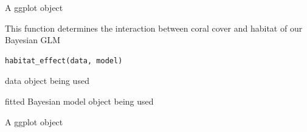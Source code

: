 \documentclass[a4paper]{book}
\begin{document}
%
\begin{Value}
A ggplot object
\end{Value}
%
\begin{Description}
This function determines the interaction between coral cover and habitat of our Bayesian GLM
\end{Description}
%
\begin{Usage}
\begin{verbatim}
habitat_effect(data, model)
\end{verbatim}
\end{Usage}
%
\begin{Arguments}
\begin{ldescription}
\item[\code{data}] data object being used

\item[\code{model}] fitted Bayesian model object being used
\end{ldescription}
\end{Arguments}
%
\begin{Value}
A ggplot object
\end{Value}
\printindex{}
\end{document}
